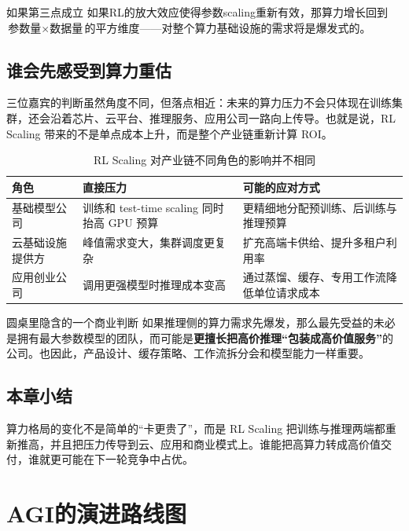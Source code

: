 \documentclass[a4paper]{article}
\begin{document}
\begin{warningbox}{如果第三点成立}
如果RL的放大效应使得参数scaling重新有效，那算力增长回到$\text{参数量} \times \text{数据量}$的平方维度——对整个算力基础设施的需求将是爆发式的。
\end{warningbox}

\subsection{谁会先感受到算力重估}
三位嘉宾的判断虽然角度不同，但落点相近：未来的算力压力不会只体现在训练集群，还会沿着芯片、云平台、推理服务、应用公司一路向上传导。也就是说，RL Scaling 带来的不是单点成本上升，而是整个产业链重新计算 ROI。

\begin{table}[H]
\centering
\begin{tabular}{p{3.2cm}p{5.2cm}p{5cm}}
\toprule
角色 & 直接压力 & 可能的应对方式 \\
\midrule
基础模型公司 & 训练和 test-time scaling 同时抬高 GPU 预算 & 更精细地分配预训练、后训练与推理预算 \\
云基础设施提供方 & 峰值需求变大，集群调度更复杂 & 扩充高端卡供给、提升多租户利用率 \\
应用创业公司 & 调用更强模型时推理成本变高 & 通过蒸馏、缓存、专用工作流降低单位请求成本 \\
\bottomrule
\end{tabular}
\caption{RL Scaling 对产业链不同角色的影响并不相同}
\end{table}

\begin{knowledgebox}{圆桌里隐含的一个商业判断}
如果推理侧的算力需求先爆发，那么最先受益的未必是拥有最大参数模型的团队，而可能是\textbf{更擅长把高价推理“包装成高价值服务”}的公司。也因此，产品设计、缓存策略、工作流拆分会和模型能力一样重要。
\end{knowledgebox}

\subsection{本章小结}
算力格局的变化不是简单的“卡更贵了”，而是 RL Scaling 把训练与推理两端都重新推高，并且把压力传导到云、应用和商业模式上。谁能把高算力转成高价值交付，谁就更可能在下一轮竞争中占优。


\section{AGI的演进路线图}
\end{document}
